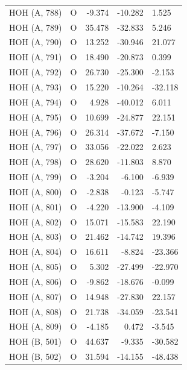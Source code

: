 \begin{longtable}{@{}lcrr@{}}
  \cmidrule(r){1-5}
  HOH (A, 788) & O & -9.374 & -10.282 & 1.525 \\
  \cmidrule(r){1-5}
  HOH (A, 789) & O & 35.478 & -32.833 & 5.246 \\
  \cmidrule(r){1-5}
  HOH (A, 790) & O & 13.252 & -30.946 & 21.077 \\
  \cmidrule(r){1-5}
  HOH (A, 791) & O & 18.490 & -20.873 & 0.399 \\
  \cmidrule(r){1-5}
  HOH (A, 792) & O & 26.730 & -25.300 & -2.153 \\
  \cmidrule(r){1-5}
  HOH (A, 793) & O & 15.220 & -10.264 & -32.118 \\
  \cmidrule(r){1-5}
  HOH (A, 794) & O & 4.928 & -40.012 & 6.011 \\
  \cmidrule(r){1-5}
  HOH (A, 795) & O & 10.699 & -24.877 & 22.151 \\
  \cmidrule(r){1-5}
  HOH (A, 796) & O & 26.314 & -37.672 & -7.150 \\
  \cmidrule(r){1-5}
  HOH (A, 797) & O & 33.056 & -22.022 & 2.623 \\
  \cmidrule(r){1-5}
  HOH (A, 798) & O & 28.620 & -11.803 & 8.870 \\
  \cmidrule(r){1-5}
  HOH (A, 799) & O & -3.204 & -6.100 & -6.939 \\
  \cmidrule(r){1-5}
  HOH (A, 800) & O & -2.838 & -0.123 & -5.747 \\
  \cmidrule(r){1-5}
  HOH (A, 801) & O & -4.220 & -13.900 & -4.109 \\
  \cmidrule(r){1-5}
  HOH (A, 802) & O & 15.071 & -15.583 & 22.190 \\
  \cmidrule(r){1-5}
  HOH (A, 803) & O & 21.462 & -14.742 & 19.396 \\
  \cmidrule(r){1-5}
  HOH (A, 804) & O & 16.611 & -8.824 & -23.366 \\
  \cmidrule(r){1-5}
  HOH (A, 805) & O & 5.302 & -27.499 & -22.970 \\
  \cmidrule(r){1-5}
  HOH (A, 806) & O & -9.862 & -18.676 & -0.099 \\
  \cmidrule(r){1-5}
  HOH (A, 807) & O & 14.948 & -27.830 & 22.157 \\
  \cmidrule(r){1-5}
  HOH (A, 808) & O & 21.738 & -34.059 & -23.541 \\
  \cmidrule(r){1-5}
  HOH (A, 809) & O & -4.185 & 0.472 & -3.545 \\
  \cmidrule(r){1-5}
  HOH (B, 501) & O & 44.637 & -9.335 & -30.582 \\
  \cmidrule(r){1-5}
  HOH (B, 502) & O & 31.594 & -14.155 & -48.438 \\

\end{longtable}
